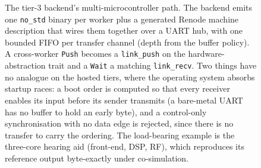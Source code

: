 \begin{figure}[tbp]
  \caption[Multi-microcontroller UART-hub co-simulation]{The tier-3 backend's
    multi-microcontroller path. The backend emits one \texttt{no\_std} binary per
    worker plus a generated Renode machine description that wires them together
    over a UART hub, with one bounded FIFO per transfer channel (depth from the
    buffer policy). A cross-worker \texttt{Push} becomes a \texttt{link\_push} on
    the hardware-abstraction trait and a \texttt{Wait} a matching
    \texttt{link\_recv}. Two things have no analogue on the hosted tiers, where
    the operating system absorbs startup races: a boot order is computed so that
    every receiver enables its input before its sender transmits (a bare-metal
    UART has no buffer to hold an early byte), and a control-only synchronisation
    with no data edge is rejected, since there is no transfer to carry the
    ordering. The load-bearing example is the three-core hearing aid (front-end,
    DSP, RF), which reproduces its reference output byte-exactly under
    co-simulation.}
  \label{fig:embedded-multimcu}
\end{figure}
